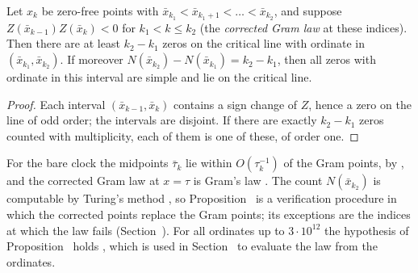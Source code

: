 \begin{proposition}\label{prop:verification}
Let $x_k$ be zero-free points with $\bar x_{k_1}<\bar x_{k_1+1}<\dots<\bar x_{k_2}$, and suppose $Z(\bar x_{k-1})Z(\bar x_k)<0$ for $k_1<k\le k_2$ (the \emph{corrected Gram law} at these indices). Then there are at least $k_2-k_1$ zeros on the critical line with ordinate in $(\bar x_{k_1},\bar x_{k_2})$. If moreover $N(\bar x_{k_2})-N(\bar x_{k_1})=k_2-k_1$, then all zeros with ordinate in this interval are simple and lie on the critical line.
\end{proposition}

\begin{proof}
Each interval $(\bar x_{k-1},\bar x_k)$ contains a sign change of $Z$, hence a zero on the line of odd order; the intervals are disjoint. If there are exactly $k_2-k_1$ zeros counted with multiplicity, each of them is one of these, of order one.
\end{proof}

For the bare clock the midpoints $\bar\tau_k$ lie within $O(\tau_k^{-1})$ of the Gram points, by , and the corrected Gram law at $x=\tau$ is Gram's law \cite{Gram1903}. The count $N(\bar x_{k_2})$ is computable by Turing's method \cite{Turing1953}, so Proposition~ is a verification procedure in which the corrected points replace the Gram points; its exceptions are the indices at which the law fails (Section~). For all ordinates up to $3\cdot10^{12}$ the hypothesis of Proposition~ holds \cite{PlattTrudgian2021}, which is used in Section~ to evaluate the law from the ordinates.

